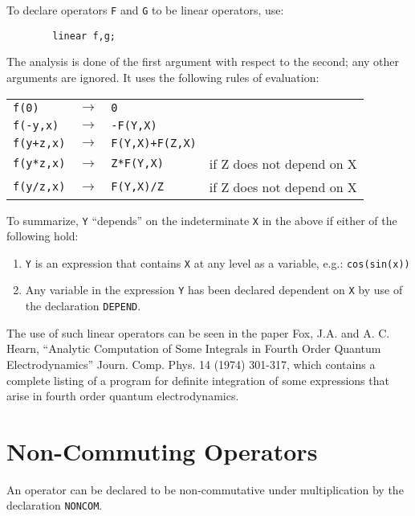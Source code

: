 To declare operators \texttt{F} and \texttt{G} to be linear operators,
use:
\begin{verbatim}
        linear f,g;
\end{verbatim}
The analysis is done of the first argument with respect to the second; any
other arguments are ignored. It uses the following rules of evaluation:
\begin{flushleft}
  \hspace{0.5in}%
  \begin{tabular}{llll}
    \texttt{f(0)}     & $\longrightarrow$ & \texttt{0} \\
    \texttt{f(-y,x)}  & $\longrightarrow$ & \texttt{-F(Y,X)} \\
    \texttt{f(y+z,x)} & $\longrightarrow$ & \texttt{F(Y,X)+F(Z,X)} & \\
    \texttt{f(y*z,x)} & $\longrightarrow$ & \texttt{Z*F(Y,X)}      &
    if Z does not depend on X \\
    \texttt{f(y/z,x)} & $\longrightarrow$ & \texttt{F(Y,X)/Z}      &
    if Z does not depend on X
  \end{tabular}
\end{flushleft}
To summarize, \texttt{Y} ``depends'' on the indeterminate \texttt{X} in the above
if either of the following hold:
\begin{enumerate}
\item \texttt{Y} is an expression that contains \texttt{X} at any level as a
      variable, e.g.: \texttt{cos(sin(x))}

\item Any variable in the expression \texttt{Y} has been declared dependent on
      \texttt{X} by use of the declaration \texttt{DEPEND}.
\end{enumerate}
The use of such linear operators can be seen in the
paper Fox, J.A. and A. C. Hearn, ``Analytic Computation of Some Integrals
in Fourth Order Quantum Electrodynamics'' Journ. Comp. Phys. 14 (1974)
301-317, which contains a complete listing of a program for definite
integration of some expressions that arise in fourth
order quantum electrodynamics.

\section{Non-Commuting Operators}
\hypertarget{command:NONCOM}{}
An operator can be declared to be non-commutative under multiplication by
the declaration \texttt{NONCOM}.

